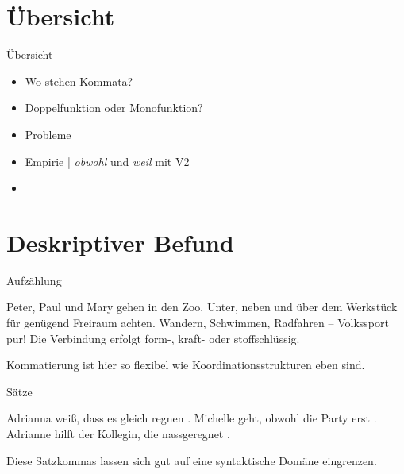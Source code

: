 \section{Übersicht}

\begin{frame}
  {Übersicht}
  \onslide<+->
  \begin{itemize}[<+->]
    \item Wo stehen Kommata?
      \Zeile
    \item Doppelfunktion oder Monofunktion?
    \item Probleme
      \Zeile
    \item Empirie | \textit{obwohl} und \textit{weil} mit V2
      \Zeile
    \item \citet{Schaefer2018b,SchaeferSayatz2016}
  \end{itemize}
\end{frame}

\section[Befund]{Deskriptiver Befund}

\begin{frame}
  {Aufzählung}
  \onslide<+->
  \onslide<+->
  \begin{exe}
    \ex \alert{Peter, Paul und Mary} gehen in den Zoo.
    \ex \alert{Unter, neben und über} dem Werkstück für genügend Freiraum achten.
    \ex \alert{Wandern, Schwimmen, Radfahren} -- Volkssport pur!
    \ex Die Verbindung erfolgt \alert{form-, kraft- oder stoff}schlüssig.
  \end{exe}
  \onslide<+->
  \Zeile
  Kommatierung ist hier so flexibel wie Koordinationsstrukturen eben sind.
\end{frame}

\begin{frame}
  {Sätze}
  \onslide<+->
  \onslide<+->
  \begin{exe}
    \ex
    \begin{xlist}
	  \ex {}
	  \ex {}
    \end{xlist}
    \Zeile
    \ex Adrianna weiß, \alert{dass es gleich regnen} .
    \ex Michelle geht, \alert{obwohl die Party erst} .
    \ex Adrianne hilft der Kollegin, \alert{die nassgeregnet} .
    \Zeile
    \ex {}
  \end{exe}
  \onslide<+->
  \Zeile
  Diese Satzkommas lassen sich gut auf eine syntaktische Domäne eingrenzen.
\end{frame}

